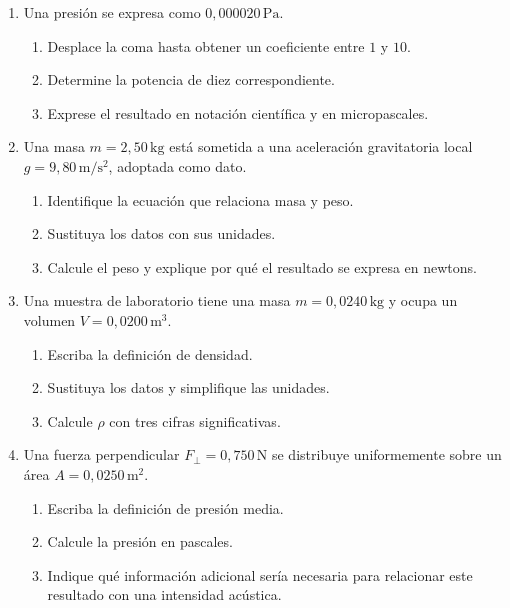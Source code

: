 \begin{enumerate}[label=\textbf{NG\arabic*.},leftmargin=*]
    \item Una presión se expresa como \(0{,}000020\,\text{Pa}\).
    \begin{enumerate}[label=\alph*)]
        \item Desplace la coma hasta obtener un coeficiente entre \(1\) y \(10\).
        \item Determine la potencia de diez correspondiente.
        \item Exprese el resultado en notación científica y en micropascales.
    \end{enumerate}

    \item Una masa \(m=2{,}50\,\text{kg}\) está sometida a una aceleración gravitatoria local \(g=9{,}80\,\text{m}/\text{s}^{2}\), adoptada como dato.
    \begin{enumerate}[label=\alph*)]
        \item Identifique la ecuación que relaciona masa y peso.
        \item Sustituya los datos con sus unidades.
        \item Calcule el peso y explique por qué el resultado se expresa en newtons.
    \end{enumerate}

    \item Una muestra de laboratorio tiene una masa \(m=0{,}0240\,\text{kg}\) y ocupa un volumen \(V=0{,}0200\,\text{m}^{3}\).
    \begin{enumerate}[label=\alph*)]
        \item Escriba la definición de densidad.
        \item Sustituya los datos y simplifique las unidades.
        \item Calcule \(\rho\) con tres cifras significativas.
    \end{enumerate}

    \item Una fuerza perpendicular \(F_\perp=0{,}750\,\text{N}\) se distribuye uniformemente sobre un área \(A=0{,}0250\,\text{m}^{2}\).
    \begin{enumerate}[label=\alph*)]
        \item Escriba la definición de presión media.
        \item Calcule la presión en pascales.
        \item Indique qué información adicional sería necesaria para relacionar este resultado con una intensidad acústica.
    \end{enumerate}
\end{enumerate}

